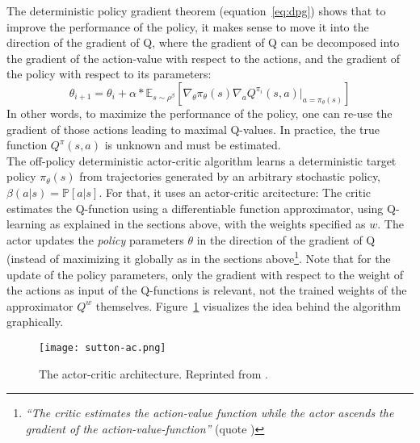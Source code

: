 The deterministic policy gradient theorem (equation~\ref{eq:dpg}) shows that to improve the performance of the policy, it makes sense to move it into the direction of the gradient of Q, where the gradient of Q can be decomposed into the gradient of the action-value with respect to the actions, and the gradient of the policy with respect to its parameters:
\begin{equation*}
	\theta_{i+1} = \theta_i + \alpha * \mathds{E}_{s \sim \rho^\beta} \left[ \nabla_\theta \pi_{\theta}(s) \nabla_a Q^{\pi_i}(s,a) \big|_{a=\pi_\theta(s)} \right]
\end{equation*} 
In other words, to maximize the performance of the policy, one can re-use the gradient of those actions leading to maximal Q-values. In practice, the true function $Q^\pi(s,a)$ is unknown and must be estimated.\\

\noindent The off-policy deterministic actor-critic algorithm learns a deterministic target policy $\pi_\theta(s)$ from trajectories generated by an arbitrary stochastic policy, $\beta(a|s) = \mathds{P}[a|s]$. For that, it uses an actor-critic arcitecture: The critic estimates the Q-function using a differentiable function approximator, using Q-learning as explained in the sections above, with the weights specified as $w$. The actor updates the \textit{policy} parameters $\theta$ in the direction of the gradient of Q (instead of maximizing it globally as in the sections above\footnote{\textit{``The critic estimates the action-value function while the actor ascends the gradient of the action-value-function''} (quote \cite{silver_deterministic_2014})}. Note that for the update of the policy parameters, only the gradient with respect to the weight of the actions as input of the Q-functions is relevant, not the trained weights of the approximator $Q^w$ themselves. Figure~\ref{fig:actorcritic} visualizes the idea behind the algorithm graphically.
\begin{figure}[h]
	\texttt{[image: sutton-ac.png]}
	\centering
	\caption[The actor-critic architecture]{The actor-critic architecture. Reprinted from \cite{richard_s._sutton_reinforcement_1998}.}
	\label{fig:actorcritic}
\end{figure}


